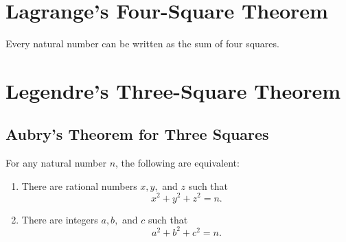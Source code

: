 \chapter{Lagrange's Four-Square Theorem}

\begin{theorem}
  Every natural number can be written as the sum of four squares.
\end{theorem}

\chapter{Legendre's Three-Square Theorem}

\section{Aubry's Theorem for Three Squares}

\begin{theorem}
  For any natural number $n$, the following are equivalent:
  \begin{enumerate}
  \item There are rational numbers $x, y,$ and $z$ such that
    \begin{equation*}
      x^2+y^2+z^2=n.
    \end{equation*}
  \item There are integers $a, b,$ and $c$ such that
    \begin{equation*}
      a^2+b^2+c^2=n.
    \end{equation*}
  \end{enumerate}
\end{theorem}

